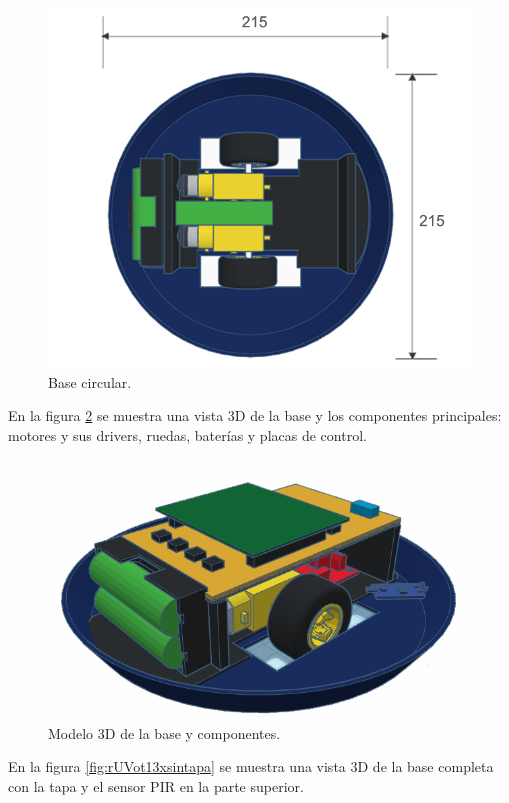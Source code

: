 \begin{figure}[h]
	\centering
	\includegraphics[width=12cm]{./Figures/base2.png}
	\caption{Base circular.}
	\label{fig:base2}
\end{figure}

En la figura \ref{fig:basearmada} se muestra una vista 3D  de la base y los componentes principales: motores y sus drivers, ruedas, baterías y placas de control.

\begin{figure}[h]
	\centering
	\includegraphics[width=12cm]{./Figures/basearmada.png}
	\caption{Modelo 3D de la base y componentes.}
	\label{fig:basearmada}
\end{figure}


En la figura \ref{fig:rUVot13xsintapa} se muestra una vista 3D de la base completa con la tapa y el sensor PIR en la parte superior.

